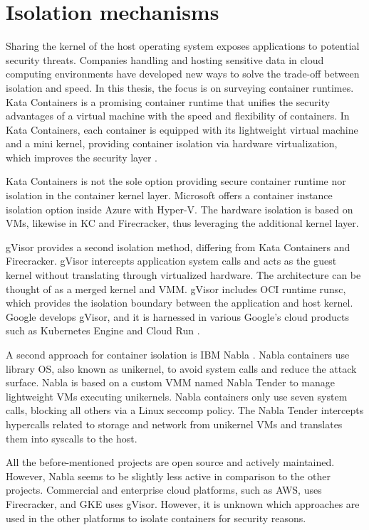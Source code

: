 \section{Isolation mechanisms}
\label{section:isolation}

Sharing the kernel of the host operating system exposes applications to potential security threats. Companies handling and hosting sensitive data in cloud computing environments have developed new ways to solve the trade-off between isolation and speed. In this thesis, the focus is on surveying container runtimes. Kata Containers is a promising container runtime that unifies the security advantages of a virtual machine with the speed and flexibility of containers. In Kata Containers, each container is equipped with its lightweight virtual machine and a mini kernel, providing container isolation via hardware virtualization, which improves the security layer \cite{Kumar2020}.

Kata Containers is not the sole option providing secure container runtime nor isolation in the container kernel layer. Microsoft offers a container instance isolation option inside Azure with Hyper-V. The hardware isolation is based on VMs, likewise in KC and Firecracker, thus leveraging the additional kernel layer. \cite{Hyper-V}

gVisor provides a second isolation method, differing from Kata Containers and Firecracker. gVisor intercepts application system calls and acts as the guest kernel without translating through virtualized hardware. The architecture can be thought of as a merged kernel and VMM. gVisor includes OCI runtime runsc, which provides the isolation boundary between the application and host kernel. Google develops gVisor, and it is harnessed in various Google's cloud products such as Kubernetes Engine \cite{GKE} and Cloud Run \cite{CloudRun}. \cite{Debab2021}\cite{gVisor}

A second approach for container isolation is IBM Nabla \cite{Nabla}. Nabla containers use library OS, also known as unikernel, to avoid system calls and reduce the attack surface. Nabla is based on a custom VMM named Nabla Tender to manage lightweight VMs executing unikernels. Nabla containers only use seven system calls, blocking all others via a Linux seccomp policy. The Nabla Tender intercepts hypercalls related to storage and network from unikernel VMs and translates them into syscalls to the host. \cite{Debab2021}

All the before-mentioned projects are open source and actively maintained. However, Nabla seems to be slightly less active in comparison to the other projects. Commercial and enterprise cloud platforms, such as AWS, uses Firecracker, and GKE uses gVisor. However, it is unknown which approaches are used in the other platforms to isolate containers for security reasons.


